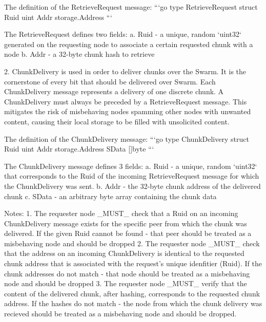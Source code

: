 The definition of the RetrieveRequest message:
```go
type RetrieveRequest struct {
	Ruid uint
	Addr storage.Address
}
```

The RetrieveRequest defines two fields:
a. Ruid - a unique, random `uint32` generated on the requesting node to associate a certain requested chunk with a node
b. Addr - a 32-byte chunk hash to retrieve

2. ChunkDelivery is used in order to deliver chunks over the Swarm. It is the cornerstone of every bit that should be delivered over Swarm. Each ChunkDelivery message represents a delivery of one discrete chunk.
A ChunkDelivery must always be preceded by a RetrieveRequest message. This mitigates the risk of misbehaving nodes spamming other nodes with unwanted content, causing their local storage to be
filled with unsolicited content.

The definition of the ChunkDelivery message:
```go
type ChunkDelivery struct {
	Ruid  uint
	Addr  storage.Address
	SData []byte
}
```

The ChunkDelivery message defines 3 fields:
a. Ruid - a unique, random `uint32` that corresponds to the Ruid of the incoming RetrieveRequest message for which the ChunkDelivery was sent.
b. Addr - the 32-byte chunk address of the delivered chunk
c. SData - an arbitrary byte array containing the chunk data


Notes:
1. The requester node _MUST_ check that a Ruid on an incoming ChunkDelivery message exists for the specific peer from which the chunk was delivered. If the given Ruid cannot be found - that peer should be treated as a misbehaving node and should be dropped
2. The requester node _MUST_ check that the address on an incoming ChunkDelivery is identical to the requested chunk address that is associated with the request's unique idenfitier (Ruid). If the chunk addresses do not match - that node should be treated as a misbehaving node and should be dropped
3. The requester node _MUST_ verify that the content of the delivered chunk, after hashing, corresponds to the requested chunk address. If the hashes do not match - the node from which the chunk delivery was recieved should be treated as a misbehaving node and should be dropped.

